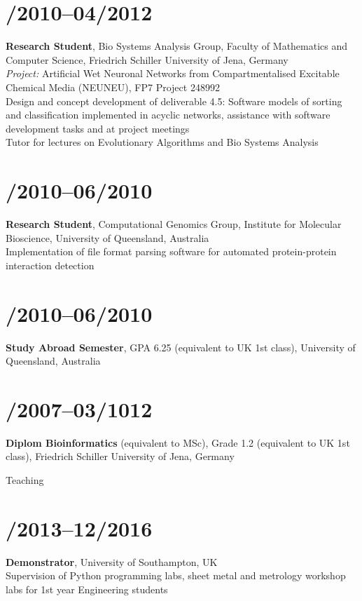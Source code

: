 \documentclass[margin,line]{res}
\begin{document}
\begin{resume}
\section{/2010--04/2012}{\bf Research Student}, Bio Systems Analysis Group, Faculty of Mathematics and Computer Science, Friedrich Schiller University of Jena, Germany\\
{\em Project:} Artificial Wet Neuronal Networks from Compartmentalised Excitable Chemical Media (NEUNEU), FP7 Project 248992\\
Design and concept development of deliverable 4.5: Software models of sorting and classification implemented in acyclic networks, assistance with software development tasks and at project meetings\\
Tutor for lectures on Evolutionary Algorithms and Bio Systems Analysis\\
\vspace*{-.35in}
\section{/2010--06/2010}{\bf Research Student}, Computational Genomics Group, Institute for Molecular Bioscience, University of Queensland, Australia\\
Implementation of file format parsing software for automated protein-protein interaction detection\\
\vspace*{-.35in}
\section{/2010--06/2010}{\bf Study Abroad Semester}, GPA 6.25 (equivalent to UK 1st class), University of Queensland, Australia\\
\vspace*{-.35in}
\section{/2007--03/1012}{\bf Diplom Bioinformatics} (equivalent to MSc), Grade 1.2 (equivalent to UK 1st class), Friedrich Schiller University of Jena, Germany\\ 

\vspace*{-.2in}

{\sc Teaching}\\
\vspace*{-.35in}
\section{/2013--12/2016}{\bf Demonstrator}, University of Southampton, UK\\
Supervision of Python programming labs, sheet metal and metrology workshop labs for 1st year Engineering students\\
\vspace*{-.35in}

\end{resume}
\end{document}
